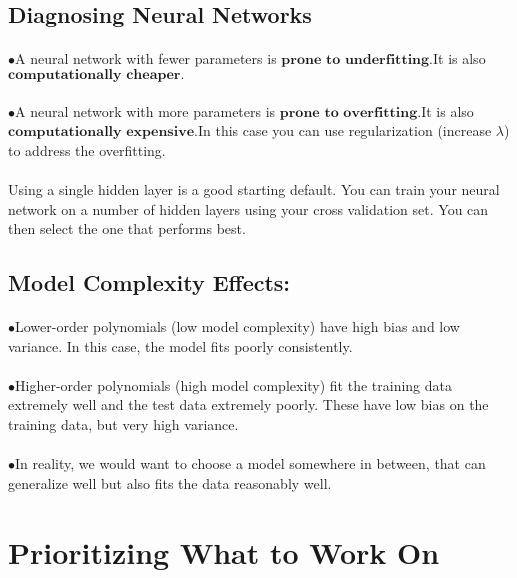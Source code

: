 \documentclass[UTF8]{ctexart}
\begin{document}
\subsection{Diagnosing Neural Networks}
\paragraph{}
$\bullet$A neural network with fewer parameters is $\textbf{prone to underfitting.}$It is also $\textbf{computationally cheaper.}$
\paragraph{}
$\bullet$A neural network with more parameters is $\textbf{prone to overfitting.}$It is also $\textbf{computationally expensive.}$In this case you can use regularization (increase $\lambda$) to address the overfitting.
\paragraph{}
Using a single hidden layer is a good starting default. You can train your neural network on a number of hidden layers using your cross validation set. You can then select the one that performs best.
\subsection{Model Complexity Effects:}
\paragraph{}
$\bullet$Lower-order polynomials (low model complexity) have high bias and low variance. In this case, the model fits poorly consistently.
\paragraph{}
$\bullet$Higher-order polynomials (high model complexity) fit the training data extremely well and the test data extremely poorly. These have low bias on the training data, but very high variance.
\paragraph{}
$\bullet$In reality, we would want to choose a model somewhere in between, that can generalize well but also fits the data reasonably well.
\section{Prioritizing What to Work On}
\end{document}
